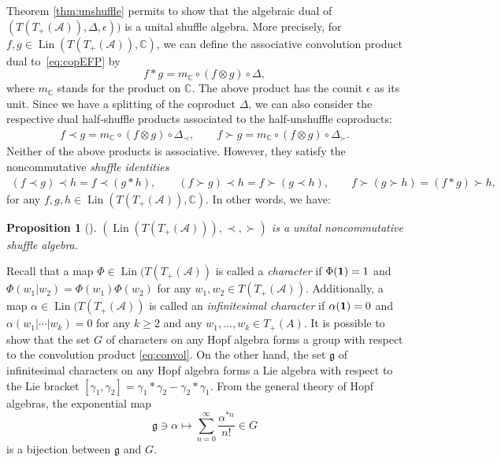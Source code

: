 \documentclass[pdftex]{sigma}%
\numberwithin{equation}{section}
\newtheorem{Proposition}[Theorem]{Proposition}
 { \theoremstyle{definition}
\newtheorem{Definition}[Theorem]{Definition}
\newtheorem{Example}[Theorem]{Example}
\newtheorem{Remark}[Theorem]{Remark} }
\newcommand{\g}{\mathfrak{g}}
\newcommand{\A}{\mathcal{A}}
\newcommand{\uno}{{\bf{1}}}
\begin{document}
Theorem \ref{thm:unshuffle} permits to show that the algebraic dual of $(T(T_+(\A)),\Delta,\epsilon))$ is a unital shuffle algebra. More precisely, for $f,g\in \operatorname{Lin}(T(T_+(\A)),\mathbb{C})$, we can define the associative convolution product dual to~\eqref{eq:copEFP} by
\begin{equation}\label{eq:convol}
	f*g = m_{\mathbb{C}}\circ (f\otimes g)\circ \Delta,
\end{equation}
where $m_{\mathbb{C}}$ stands for the product on $\mathbb{C}$. The above product has the counit $\epsilon$ as its unit. Since we have a splitting of the coproduct $\Delta$, we can also consider the respective dual half-shuffle products associated to the half-unshuffle coproducts:
\begin{gather*}
	f\prec g
	= m_{\mathbb{C}}\circ (f\otimes g)\circ \Delta_{\prec},\qquad
	f\succ g
	= m_{\mathbb{C}}\circ (f\otimes g)\circ \Delta_{\succ}.
\end{gather*}
Neither of the above products is associative. However, they satisfy the noncommutative \textit{shuffle identities}
\begin{gather*}
	(f\prec g)\prec h =f\prec (g*h),\qquad\!
	(f\succ g)\prec h = f\succ (g\prec h),\qquad\!
	f\succ (g\succ h) = (f*g)\succ h,
\end{gather*}
for any $f,g,h\in \operatorname{Lin}(T(T_+(\A)),\mathbb{C})$. In other words, we have:
\begin{Proposition}[\cite{EFP1}]
$(\operatorname{Lin}(T(T_+(\A))),\prec,\succ)$ is a unital noncommutative shuffle algebra.
\end{Proposition}

Recall that a map $\Phi \in \operatorname{Lin}(T(T_+(\A))$ is called a \textit{character} if $\Phi(\uno) = 1$ and $\Phi(w_1|w_2) = \Phi(w_1)\Phi(w_2)$ for any $w_1,w_2\in T(T_+(\A))$. Additionally, a map $\alpha \in \operatorname{Lin}(T(T_+(\A))$ is called an \textit{infinitesimal character} if $\alpha({\bf{1}}) = 0$ and $\alpha(w_1|\cdots| w_k) = 0$ for any $k\geq2$ and any $w_1,\dots,w_k \allowbreak \in T_+(A)$. It is possible to show that the set $G$ of characters on any Hopf algebra forms a group with respect to the convolution product \eqref{eq:convol}. On the other hand, the set $\g$ of infinitesimal characters on any Hopf algebra forms a Lie algebra with respect to the Lie bracket $[\gamma_1,\gamma_2] = \gamma_1*\gamma_2 - \gamma_2*\gamma_1$. From the general theory of Hopf algebras, the exponential map
\[
	 \g \ni \alpha \mapsto \sum_{n=0}^\infty \frac{\alpha^{*n}}{n!}\in G
 \]
is a bijection between $\g$ and $G$.
\end{document}
